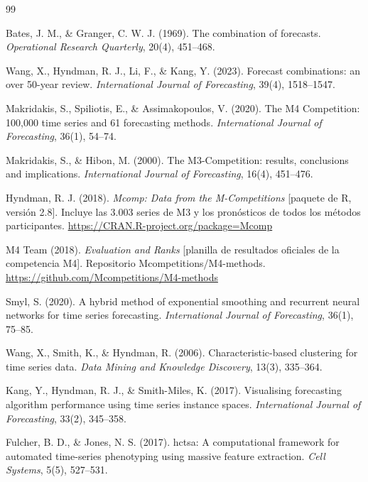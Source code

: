 {\scriptsize
\begin{thebibliography}{99}
\setlength{\itemsep}{0pt}\setlength{\parskip}{0pt}

Bates, J. M., \& Granger, C. W. J. (1969). The combination of forecasts.
\emph{Operational Research Quarterly}, 20(4), 451--468.

Wang, X., Hyndman, R. J., Li, F., \& Kang, Y. (2023). Forecast combinations: an over
50-year review. \emph{International Journal of Forecasting}, 39(4), 1518--1547.

Makridakis, S., Spiliotis, E., \& Assimakopoulos, V. (2020).
The M4 Competition: 100,000 time series and 61 forecasting methods.
\emph{International Journal of Forecasting}, 36(1), 54--74.

Makridakis, S., \& Hibon, M. (2000). The M3-Competition: results, conclusions and
implications. \emph{International Journal of Forecasting}, 16(4), 451--476.

Hyndman, R. J. (2018). \emph{Mcomp: Data from the M-Competitions} [paquete de R,
versión 2.8]. Incluye las 3.003 series de M3 y los pronósticos de todos los métodos
participantes. \url{https://CRAN.R-project.org/package=Mcomp}

M4 Team (2018). \emph{Evaluation and Ranks} [planilla de resultados oficiales de
la competencia M4]. Repositorio Mcompetitions/M4-methods.
\url{https://github.com/Mcompetitions/M4-methods}

Smyl, S. (2020). A hybrid method of exponential smoothing and recurrent neural
networks for time series forecasting.
\emph{International Journal of Forecasting}, 36(1), 75--85.

Wang, X., Smith, K., \& Hyndman, R. (2006).
Characteristic-based clustering for time series data.
\emph{Data Mining and Knowledge Discovery}, 13(3), 335--364.

Kang, Y., Hyndman, R. J., \& Smith-Miles, K. (2017). Visualising forecasting algorithm
performance using time series instance spaces.
\emph{International Journal of Forecasting}, 33(2), 345--358.

Fulcher, B. D., \& Jones, N. S. (2017). hctsa: A computational framework for
automated time-series phenotyping using massive feature extraction.
\emph{Cell Systems}, 5(5), 527--531.


\end{thebibliography}}
